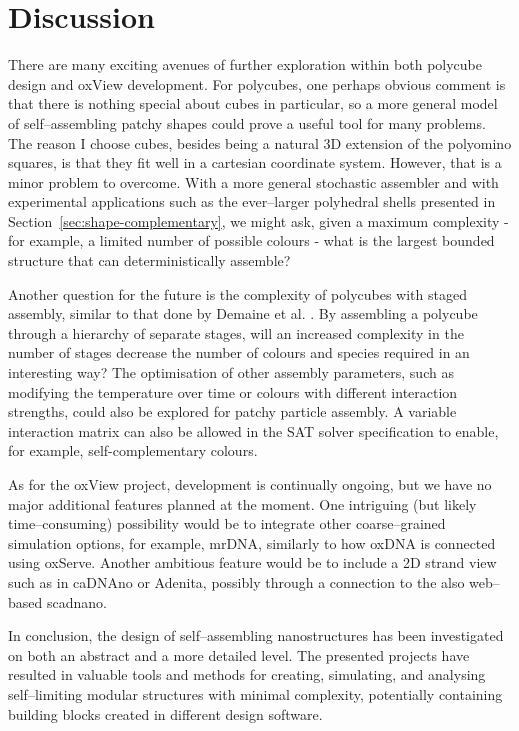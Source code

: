 \chapter{Discussion}
\label{ch:conclusion}

There are many exciting avenues of further exploration within both polycube design and oxView development. For polycubes, one perhaps obvious comment is that there is nothing special about cubes in particular, so a more general model of self--assembling patchy shapes could prove a useful tool for many problems. The reason I choose cubes, besides being a natural 3D extension of the polyomino squares, is that they fit well in a cartesian coordinate system. However, that is a minor problem to overcome. With a more general stochastic assembler and with experimental applications such as the ever--larger polyhedral shells presented in Section~\ref{sec:shape-complementary}, we might ask, given a maximum complexity - for example, a limited number of possible colours - what is the largest bounded structure that can deterministically assemble?

Another question for the future is the complexity of polycubes with staged assembly, similar to that done by Demaine et al. \cite{demaine2008staged}. By assembling a polycube through a hierarchy of separate stages, will an increased complexity in the number of stages decrease the number of colours and species required in an interesting way? The optimisation of other assembly parameters, such as modifying the temperature over time or colours with different interaction strengths, could also be explored for patchy particle assembly. A variable interaction matrix can also be allowed in the SAT solver specification to enable, for example, self-complementary colours.

As for the oxView project, development is continually ongoing, but we have no major additional features planned at the moment. One intriguing (but likely time--consuming) possibility would be to integrate other coarse--grained simulation options, for example, mrDNA, similarly to how oxDNA is connected using oxServe. Another ambitious feature would be to include a 2D strand view such as in caDNAno or Adenita, possibly through a connection to the also web--based scadnano.

In conclusion, the design of self--assembling nanostructures has been investigated on both an abstract and a more detailed level. The presented projects have resulted in valuable tools and methods for creating, simulating, and analysing self--limiting modular structures with minimal complexity, potentially containing building blocks created in different design software.